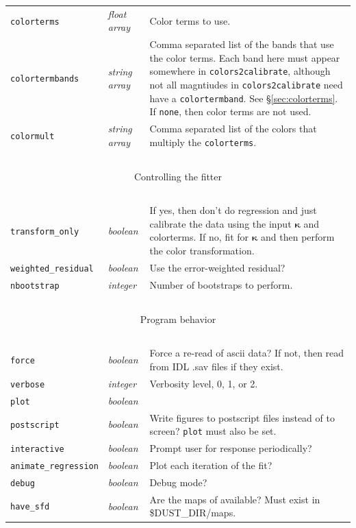 \documentclass{report}
\newcommand{\zptcolor}{\boldsymbol{\kappa}}
\begin{document}
\begin{center}
\begin{longtable}{llp{2in}}
\verb|colorterms| & {\it float array} & Color terms to use. \\
\verb|colortermbands| & {\it string array} & Comma separated list of the bands that use the color terms. Each band here must appear somewhere in \verb|colors2calibrate|, although not all magntiudes in \verb|colors2calibrate| need have a \verb|colortermband|.  See \S\ref{sec:colorterms}.  If {\tt none}, then color terms are not used. \\
\verb|colormult| & {\it string array} & Comma separated list of the colors that multiply the \verb|colorterms|. \\

~ & ~ & ~ \\ \hline
\multicolumn{3}{c}{Controlling the fitter} \\
\hline ~ & ~ & ~ \\ 

\verb|transform_only| & {\it boolean} & If yes, then don't do regression and just calibrate the data using the input $\zptcolor$ and colorterms.  If no, fit for $\zptcolor$ and then perform the color transformation. \\
\verb|weighted_residual| & {\it boolean} & Use the error-weighted residual? \\
\verb|nbootstrap| & {\it integer} & Number of bootstraps to perform. \\

~ & ~ & ~ \\ \hline
\multicolumn{3}{c}{Program behavior} \\
\hline ~ & ~ & ~ \\ 

\verb|force| & {\it boolean} & Force a re-read of ascii data? If not, then read from IDL .sav files if they exist.  \\
\verb|verbose| & {\it integer} & Verbosity level, 0, 1, or 2.  \\
\verb|plot| & {\it boolean} &  \\
\verb|postscript| & {\it boolean} & Write figures to postscript files instead of to screen? \verb|plot| must also be set.  \\
\verb|interactive| & {\it boolean} & Prompt user for response periodically? \\
\verb|animate_regression| & {\it boolean} & Plot each iteration of the fit? \\
\verb|debug| & {\it boolean} & Debug mode? \\
\verb|have_sfd| & {\it boolean} & Are the maps of \citet{bib:sfd} available? Must exist in \$DUST\_DIR/maps. \\



\end{longtable}
\end{center}
\end{document}
